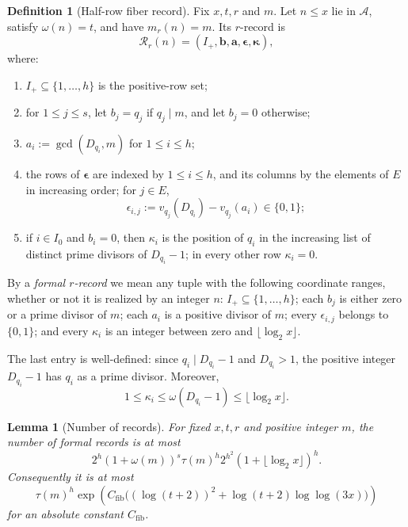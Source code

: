\documentclass[11pt]{amsart}
\newtheorem{lemma}[lemma]{Lemma}
\theoremstyle{definition}
\newtheorem{definition}[definition]{Definition}
\theoremstyle{remark}
\numberwithin{equation}{section}
\newcommand{\Acal}{\mathcal A}
\begin{document}
\begin{definition}[Half-row fiber record]\label{def:fiber-record}
Fix $x,t,r$ and $m$.  Let $n\le x$ lie in $\Acal$, satisfy
$\omega(n)=t$, and have $m_r(n)=m$.  Its $r$-record is
\[
 \mathcal R_r(n)=
 (I_+,\mathbf b,\mathbf a,\boldsymbol\epsilon,\boldsymbol\kappa),
\]
where:
\begin{enumerate}[label=\textnormal{(R\arabic*)},leftmargin=3.1em]
\item $I_+\subseteq\{1,\ldots,h\}$ is the positive-row set;
\item for $1\le j\le s$, let $b_j=q_j$ if $q_j\mid m$, and let
$b_j=0$ otherwise;
\item $a_i:=\gcd(D_{q_i},m)$ for $1\le i\le h$;
\item the rows of $\boldsymbol\epsilon$ are indexed by $1\le i\le h$,
and its columns by the elements of $E$ in increasing order; for $j\in E$,
\[
 \epsilon_{i,j}:=v_{q_j}(D_{q_i})-v_{q_j}(a_i)\in\{0,1\};
\]
\item if $i\in I_0$ and $b_i=0$, then $\kappa_i$ is the position of
$q_i$ in the increasing list of distinct prime divisors of
$D_{q_i}-1$; in every other row $\kappa_i=0$.
\end{enumerate}
\end{definition}

By a \emph{formal $r$-record} we mean any tuple with the following
coordinate ranges, whether or not it is realized by an integer $n$:
$I_+\subseteq\{1,\ldots,h\}$; each $b_j$ is either zero or a prime divisor
of $m$; each $a_i$ is a positive divisor of $m$; every
$\epsilon_{i,j}$ belongs to $\{0,1\}$; and every $\kappa_i$ is an integer
between zero and $\lfloor\log_2x\rfloor$.

The last entry is well-defined: since $q_i\mid D_{q_i}-1$ and
$D_{q_i}>1$, the positive integer $D_{q_i}-1$ has $q_i$ as a prime
divisor.  Moreover,
\begin{equation}\label{eq:kappa-bound}
 1\le\kappa_i\le\omega(D_{q_i}-1)\le\lfloor\log_2x\rfloor.
\end{equation}

\begin{lemma}[Number of records]\label{lem:record-count}
For fixed $x,t,r$ and positive integer $m$, the number of formal records is at most
\begin{equation}\label{eq:record-count-exact}
 2^h(1+\omega(m))^s\tau(m)^h2^{h^2}
 (1+\lfloor\log_2x\rfloor)^h.
\end{equation}
Consequently it is at most
\begin{equation}\label{eq:record-count-soft}
 \tau(m)^h
 \exp\!\left(C_{\mathrm{fib}}\bigl((\log(t+2))^2+
 \log(t+2)\log\log(3x)\bigr)\right)
\end{equation}
for an absolute constant $C_{\mathrm{fib}}$.
\end{lemma}
\end{document}
